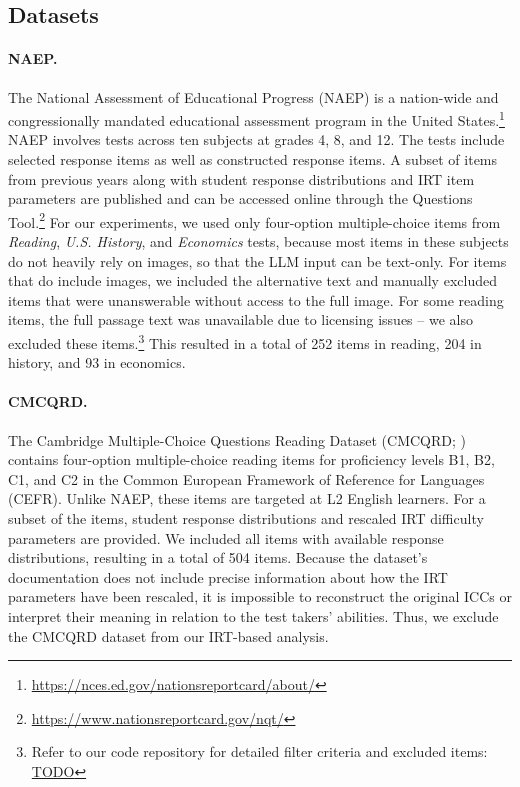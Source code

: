 \documentclass[11pt]{article}
\begin{document}
\subsection{Datasets}
\label{sec:experiment:datasets}

\paragraph{NAEP.}

The National Assessment of Educational Progress (NAEP) is a nation-wide and congressionally mandated educational assessment program in the United States.\footnote{\url{https://nces.ed.gov/nationsreportcard/about/}} NAEP involves tests across ten subjects at grades 4, 8, and 12. The tests include selected response items as well as constructed response items. A subset of items from previous years along with student response distributions and IRT item parameters are published and can be accessed online through the Questions Tool.\footnote{\url{https://www.nationsreportcard.gov/nqt/}} For our experiments, we used only four-option multiple-choice items from \emph{Reading}, \emph{U.S. History}, and \emph{Economics} tests, because most items in these subjects do not heavily rely on images, so that the LLM input can be text-only. For items that do include images, we included the alternative text and manually excluded items that were unanswerable without access to the full image. For some reading items, the full passage text was unavailable due to licensing issues -- we also excluded these items.\footnote{Refer to our code repository for detailed filter criteria and excluded items: \url{TODO}} This resulted in a total of 252 items in reading, 204 in history, and 93 in economics.

\paragraph{CMCQRD.}

The Cambridge Multiple-Choice Questions Reading Dataset (CMCQRD; \citealp{Mullooly2023}) contains four-option multiple-choice reading items for proficiency levels B1, B2, C1, and C2 in the Common European Framework of Reference for Languages (CEFR). Unlike NAEP, these items are targeted at L2 English learners. For a subset of the items, student response distributions and rescaled IRT difficulty parameters are provided. We included all items with available response distributions, resulting in a total of 504 items. Because the dataset's documentation does not include precise information about how the IRT parameters have been rescaled, it is impossible to reconstruct the original ICCs or interpret their meaning in relation to the test takers' abilities. Thus, we exclude the CMCQRD dataset from our IRT-based analysis.
\end{document}

